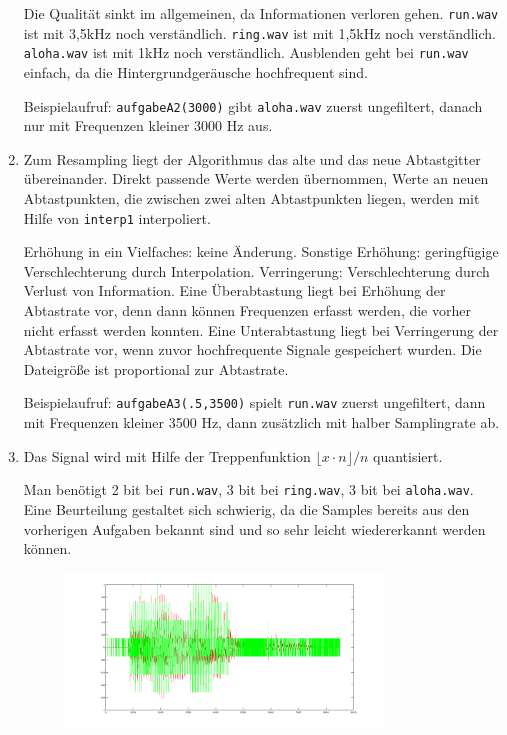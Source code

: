 \documentclass[a4paper,10pt]{scrartcl}
\begin{document}
\begin{enumerate}
Die Qualität sinkt im allgemeinen, da Informationen verloren gehen. \texttt{run.wav} ist mit 3,5kHz noch verständlich. \texttt{ring.wav} ist mit 1,5kHz noch verständlich. \texttt{aloha.wav} ist mit 1kHz noch verständlich. Ausblenden geht bei \texttt{run.wav} einfach, da die Hintergrundgeräusche hochfrequent sind.

Beispielaufruf: \texttt{aufgabeA2(3000)} gibt \texttt{aloha.wav} zuerst ungefiltert, danach nur mit Frequenzen kleiner 3000 Hz aus.
 \item Zum Resampling liegt der Algorithmus das alte und das neue Abtastgitter übereinander. Direkt passende Werte werden übernommen, Werte an neuen Abtastpunkten, die zwischen zwei alten Abtastpunkten liegen, werden mit Hilfe von \texttt{interp1} interpoliert. 

Erhöhung in ein Vielfaches: keine Änderung. Sonstige Erhöhung: geringfügige Verschlechterung durch Interpolation. Verringerung: Verschlechterung durch Verlust von Information. Eine Überabtastung liegt bei Erhöhung der Abtastrate vor, denn dann können Frequenzen erfasst werden, die vorher nicht erfasst werden konnten. Eine Unterabtastung liegt bei Verringerung der Abtastrate vor, wenn zuvor hochfrequente Signale gespeichert wurden. Die Dateigröße ist proportional zur Abtastrate.

Beispielaufruf: \texttt{aufgabeA3(.5,3500)} spielt \texttt{run.wav} zuerst ungefiltert, dann mit Frequenzen kleiner 3500 Hz, dann zusätzlich mit halber Samplingrate ab. 
 \item Das Signal wird mit Hilfe der Treppenfunktion \(\lfloor x \cdot n \rfloor / n \) quantisiert.

Man benötigt 2 bit bei \texttt{run.wav}, 3 bit bei \texttt{ring.wav}, 3 bit bei \texttt{aloha.wav}. Eine Beurteilung gestaltet sich schwierig, da die Samples bereits aus den vorherigen Aufgaben bekannt sind und so sehr leicht wiedererkannt werden können.
\begin{figure}[h]
 \centering
 \includegraphics[width=0.8\textwidth]{./Bilder/A/1_4.png}
\end{figure}


\end{enumerate}
\end{document}
